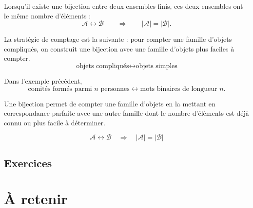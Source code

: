 \documentclass[11pt]{article}
\begin{document}
\begin{proposition}\label{prop:bijection-cardinal}
Lorsqu'il existe une bijection entre deux ensembles finis, ces deux ensembles
ont le même nombre d'éléments :
\[
\boxed{
\mathcal A\longleftrightarrow\mathcal B
\qquad\Longrightarrow\qquad
|\mathcal A|=|\mathcal B|.
}
\]
\end{proposition}

\begin{methode}
La stratégie de comptage est la suivante : pour compter une famille d'objets compliqués,
on construit une bijection avec une famille d'objets plus faciles à compter.
\[
\boxed{
\text{objets compliqués}
\longleftrightarrow
\text{objets simples}
}
\]
\end{methode}

Dans l'exemple précédent,
\[
\boxed{
\text{comités formés parmi \(n\) personnes}
\longleftrightarrow
\text{mots binaires de longueur \(n\)}.
}
\]

\begin{retenir}
Une bijection permet de compter une famille d'objets en la mettant en
correspondance parfaite avec une autre famille dont le nombre d'éléments est
déjà connu ou plus facile à déterminer.

\[
\boxed{
\mathcal A\longleftrightarrow\mathcal B
\quad\Longrightarrow\quad
|\mathcal A|=|\mathcal B|
}
\]
\end{retenir}

\subsection*{Exercices}




\section{À retenir}\label{sec:retenir}
\end{document}
